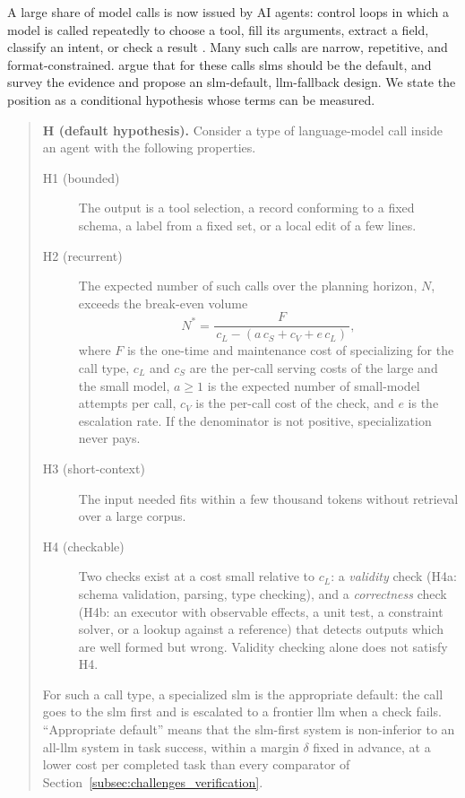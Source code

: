 A large share of model calls is now issued by AI agents: control loops in which a model is called repeatedly to choose a tool, fill its arguments, extract a field, classify an intent, or check a result \citep{belcak2025slm_agentic,chen2024mas_survey}. Many such calls are narrow, repetitive, and format-constrained. \citet{belcak2025slm_agentic} argue that for these calls \glspl{slm} should be the default, and \citet{sharma2025slm_agentic} survey the evidence and propose an \gls{slm}-default, \gls{llm}-fallback design. We state the position as a conditional hypothesis whose terms can be measured.

\begin{quote}
\textbf{H (default hypothesis).} Consider a type of language-model call inside an agent with the following properties.
\begin{description}
  \item[H1 (bounded)] The output is a tool selection, a record conforming to a fixed schema, a label from a fixed set, or a local edit of a few lines.
  \item[H2 (recurrent)] The expected number of such calls over the planning horizon, $N$, exceeds the break-even volume
  \begin{equation}
    N^{*} = \frac{F}{\,c_L - (a\,c_S + c_V + e\,c_L)\,},
    \label{eq:breakeven}
  \end{equation}
  where $F$ is the one-time and maintenance cost of specializing for the call type, $c_L$ and $c_S$ are the per-call serving costs of the large and the small model, $a \ge 1$ is the expected number of small-model attempts per call, $c_V$ is the per-call cost of the check, and $e$ is the escalation rate. If the denominator is not positive, specialization never pays.
  \item[H3 (short-context)] The input needed fits within a few thousand tokens without retrieval over a large corpus.
  \item[H4 (checkable)] Two checks exist at a cost small relative to $c_L$: a \emph{validity} check (H4a: schema validation, parsing, type checking), and a \emph{correctness} check (H4b: an executor with observable effects, a unit test, a constraint solver, or a lookup against a reference) that detects outputs which are well formed but wrong. Validity checking alone does not satisfy H4.
\end{description}
For such a call type, a specialized \gls{slm} is the appropriate default: the call goes to the \gls{slm} first and is escalated to a frontier \gls{llm} when a check fails. ``Appropriate default'' means that the \gls{slm}-first system is non-inferior to an all-\gls{llm} system in task success, within a margin $\delta$ fixed in advance, at a lower cost per completed task than every comparator of Section~\ref{subsec:challenges_verification}.
\end{quote}

